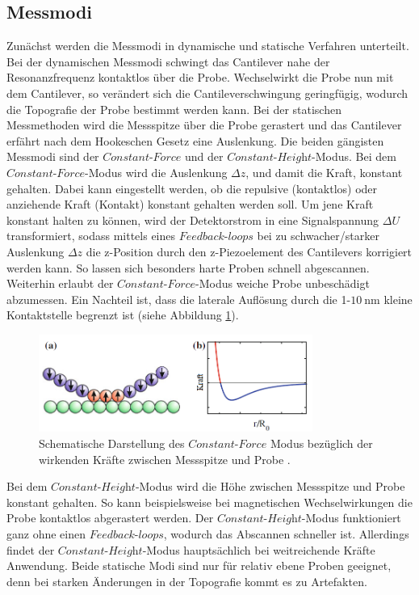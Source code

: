 \subsection{Messmodi}
\label{sec:Messmodi}
Zunächst werden die Messmodi in dynamische und statische Verfahren unterteilt.
Bei der dynamischen Messmodi schwingt das Cantilever nahe der Resonanzfrequenz
kontaktlos über die Probe. Wechselwirkt die Probe nun mit dem Cantilever, so verändert
sich die Cantileverschwingung geringfügig, wodurch die Topografie der Probe bestimmt
werden kann.
Bei der statischen Messmethoden wird die Messspitze über die Probe gerastert und
das Cantilever erfährt nach dem Hookeschen Gesetz eine Auslenkung. Die beiden
gängisten Messmodi sind der $\textit{Constant-Force}$ und der
$\textit{Constant-Height}$-Modus. Bei dem $\textit{Constant-Force}$-Modus wird
die Auslenkung $\Delta z$, und damit die Kraft, konstant gehalten. Dabei kann
eingestellt werden, ob die repulsive (kontaktlos) oder anziehende Kraft (Kontakt)
konstant gehalten werden soll. Um jene Kraft konstant halten zu können, wird der
Detektorstrom in eine Signalspannung $\Delta U$ transformiert, sodass mittels
eines $\textit{Feedback-loops}$ bei zu schwacher/starker Auslenkung $\Delta z$
die z-Position durch den z-Piezoelement des Cantilevers korrigiert werden kann.
So lassen sich besonders harte Proben schnell abgescannen. Weiterhin erlaubt der
$\textit{Constant-Force}$-Modus weiche Probe unbeschädigt abzumessen. Ein Nachteil
ist, dass die laterale Auflösung durch die 1-$\SI{10}{\nano\meter}$ kleine
Kontaktstelle begrenzt ist (siehe Abbildung \ref{fig:const-force}).

\begin{figure}[H]
	\centering
	\includegraphics[width=0.8\textwidth]{Abb/const-force.png}
	\caption{Schematische Darstellung des $\textit{Constant-Force}$ Modus bezüglich
	der wirkenden Kräfte zwischen Messspitze und Probe \cite[179]{AFM}.}
	\label{fig:const-force}
\end{figure}

\noindent
Bei dem
$\textit{Constant-Height}$-Modus wird die Höhe zwischen Messspitze und Probe
konstant gehalten. So kann beispielsweise bei magnetischen Wechselwirkungen die
Probe kontaktlos abgerastert werden. Der $\textit{Constant-Height}$-Modus funktioniert
ganz ohne einen $\textit{Feedback}${\-}$\textit{-loops}$, wodurch das Abscannen schneller ist.
Allerdings findet der $\textit{Constant-Height}$-Modus hauptsächlich bei weitreichende
Kräfte Anwendung. Beide statische Modi sind nur für relativ ebene Proben geeignet,
denn bei starken Änderungen in der Topografie kommt es zu Artefakten.


